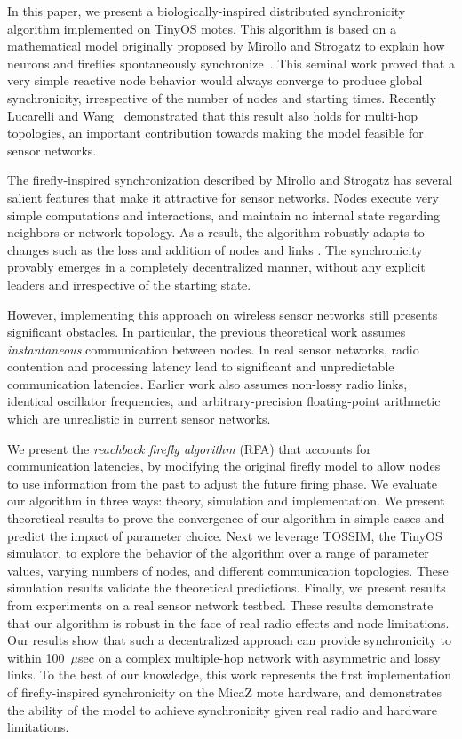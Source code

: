 In this paper, we present a biologically-inspired distributed
synchronicity algorithm implemented on TinyOS motes. This algorithm is
based on a mathematical model originally proposed by Mirollo and
Strogatz to explain how neurons and fireflies spontaneously
synchronize~\cite{strogatz}. This seminal work proved that a very
simple reactive node behavior would always converge to produce global
synchronicity, irrespective of the number of nodes and starting
times. Recently Lucarelli and Wang~\cite{lucarelli04} demonstrated
that this result also holds for multi-hop topologies, an important
contribution towards making the model feasible for sensor networks.

The firefly-inspired synchronization described by Mirollo and Strogatz
has several salient features that make it attractive for sensor
networks. Nodes execute very simple computations and interactions, and
maintain no internal state regarding neighbors or network topology. As
a result, the algorithm robustly adapts to changes such as the loss
and addition of nodes and links \cite{lucarelli04}. The synchronicity
provably emerges in a completely decentralized manner, without any
explicit leaders and irrespective of the starting state.

However, implementing this approach on wireless sensor networks still
presents significant obstacles. In particular, the previous
theoretical work assumes {\em instantaneous} communication between
nodes.  In real sensor networks, radio contention and processing
latency lead to significant and unpredictable communication
latencies. Earlier work also assumes non-lossy radio links, identical
oscillator frequencies, and arbitrary-precision floating-point
arithmetic which are unrealistic in current sensor networks.

We present the {\em reachback firefly algorithm} (RFA) that accounts for
communication latencies, by modifying the original firefly model to
allow nodes to use information from the past to adjust the future
firing phase. We evaluate our algorithm in three ways: theory,
simulation and implementation. We present theoretical results to prove
the convergence of our algorithm in simple cases and predict the
impact of parameter choice. Next we leverage TOSSIM, the TinyOS
simulator, to explore the behavior of the algorithm over a range of
parameter values, varying numbers of nodes, and different
communication topologies. These simulation results validate the
theoretical predictions. Finally, we present results from experiments
on a real sensor network testbed. These results demonstrate that our
algorithm is robust in the face of real radio effects and node
limitations.  Our results show that such a decentralized approach can
provide synchronicity to within 100~$\mu$sec on a complex multiple-hop
network with asymmetric and lossy links. To the best of our knowledge,
this work represents the first implementation of firefly-inspired
synchronicity on the MicaZ mote hardware, and demonstrates the ability
of the model to achieve synchronicity given real radio and hardware
limitations.

